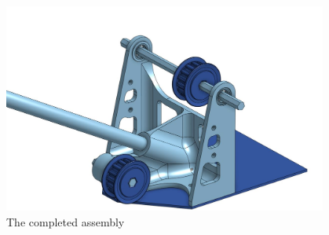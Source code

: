 \begin{figure}[htp]
\centering
\includegraphics[width=0.95\textwidth, angle=0]{Meetings/November/11-18-21/11-18-21_CAD_Figure5.JPG}
\caption{The completed assembly}
\label{fig:pic5}
\end{figure}



